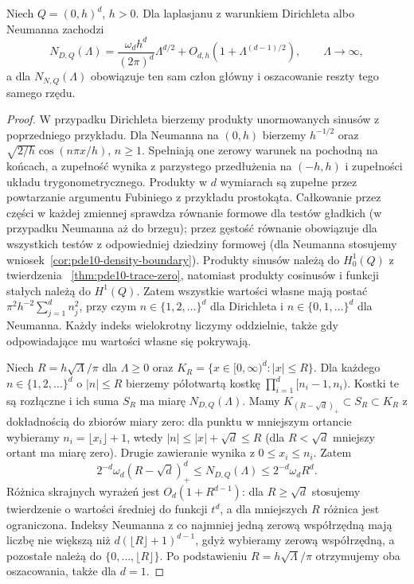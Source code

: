 \begin{lemat}
\label{lem:pde18-cube}
Niech $Q=(0,h)^d$, $h>0$. Dla laplasjanu z warunkiem
Dirichleta albo Neumanna zachodzi
\begin{equation}\label{eq:pde18-cube}
 N_{D,Q}(\Lambda)=\frac{\omega_dh^d}{(2\pi)^d}
 \Lambda^{d/2}+O_{d,h}(1+\Lambda^{(d-1)/2}),
 \qquad \Lambda\to\infty,
\end{equation}
a dla $N_{N,Q}(\Lambda)$ obowiązuje ten sam człon główny
i oszacowanie reszty tego samego rzędu.
\end{lemat}
\begin{proof}
W przypadku Dirichleta bierzemy produkty unormowanych
sinusów z poprzedniego przykładu. Dla Neumanna na $(0,h)$
bierzemy $h^{-1/2}$ oraz $\sqrt{2/h}\cos(n\pi x/h)$,
$n\ge1$. Spełniają one zerowy warunek na pochodną
na końcach, a zupełność wynika z parzystego przedłużenia
na $(-h,h)$ i zupełności układu trygonometrycznego.
Produkty w $d$ wymiarach są zupełne przez powtarzanie
argumentu Fubiniego z przykładu prostokąta. Całkowanie
przez części w każdej zmiennej sprawdza równanie formowe
dla testów gładkich (w przypadku Neumanna aż do brzegu);
przez gęstość równanie obowiązuje dla wszystkich testów
z odpowiedniej dziedziny formowej (dla Neumanna
stosujemy wniosek~\ref{cor:pde10-density-boundary}).
Produkty sinusów należą do $H_0^1(Q)$ z twierdzenia
~\ref{thm:pde10-trace-zero}, natomiast produkty cosinusów
i funkcji stałych należą do $H^1(Q)$. Zatem wszystkie
wartości własne mają postać
$\pi^2h^{-2}\sum_{j=1}^d n_j^2$, przy czym
$n\in\{1,2,\ldots\}^d$ dla Dirichleta i
$n\in\{0,1,\ldots\}^d$ dla Neumanna. Każdy indeks
wielokrotny liczymy oddzielnie, także gdy odpowiadające
mu wartości własne się pokrywają.

Niech $R=h\sqrt\Lambda/\pi$ dla $\Lambda\ge0$ oraz
$K_R=\{x\in[0,\infty)^d:|x|\le R\}$.
Dla każdego $n\in\{1,2,\ldots\}^d$ o $|n|\le R$
bierzemy półotwartą kostkę $\prod_{i=1}^d[n_i-1,n_i)$.
Kostki te są rozłączne i ich suma $S_R$ ma miarę
$N_{D,Q}(\Lambda)$. Mamy
$K_{(R-\sqrt d)_+}\subset S_R\subset K_R$
z dokładnością do zbiorów miary zero: dla punktu
w mniejszym ortancie wybieramy $n_i=\lfloor x_i\rfloor+1$,
wtedy $|n|\le|x|+\sqrt d\le R$ (dla $R<\sqrt d$
mniejszy ortant ma miarę zero). Drugie zawieranie
wynika z $0\le x_i\le n_i$.
Zatem
\[
 2^{-d}\omega_d(R-\sqrt d)_+^d
 \le N_{D,Q}(\Lambda)\le 2^{-d}\omega_dR^d.
\]
Różnica skrajnych wyrażeń jest
$O_d(1+R^{d-1})$: dla $R\ge\sqrt d$ stosujemy
twierdzenie o wartości średniej do funkcji $t^d$,
a dla mniejszych $R$ różnica jest ograniczona.
Indeksy Neumanna z co najmniej jedną zerową współrzędną
mają liczbę nie większą niż $d(\lfloor R\rfloor+1)^{d-1}$,
gdyż wybieramy zerową współrzędną, a pozostałe
należą do $\{0,\ldots,\lfloor R\rfloor\}$.
Po podstawieniu $R=h\sqrt\Lambda/\pi$ otrzymujemy
oba oszacowania, także dla $d=1$.
\end{proof}

